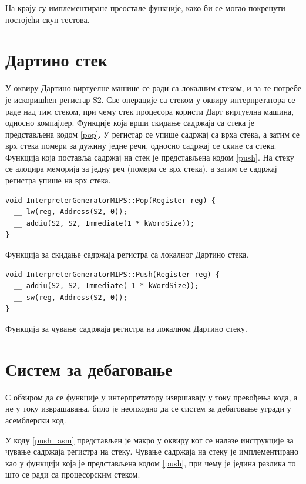 \documentclass[12pt,oneside]{memoir}
\begin{document}
На крају су имплементиране преостале функције, како би се могао покренути постојећи скуп тестова.

\section{Дартино стек}
\label{sec:stek}

У оквиру Дартино виртуелне машине се ради са локалним стеком, и за те потребе је искоришћен регистар S2. Све операције са стеком у оквиру интерпретатора се раде над тим стеком, при чему стек процесора користи Дарт виртуелна машина, односно компајлер.
Функције која врши скидање садржаја са стека је представљена кодом \ref{pop}. У регистар се упише садржај са врха стека, а затим се врх стека помери за дужину једне речи, односно садржај се скине са стека.
Функција која поставља садржај на стек је представљена кодом \ref{push}. На стеку се алоцира меморија за једну реч (помери се врх стека), а затим се садржај регистра упише на врх стека.\\

\begin{listing}
\begin{verbatim}
void InterpreterGeneratorMIPS::Pop(Register reg) {
  __ lw(reg, Address(S2, 0));
  __ addiu(S2, S2, Immediate(1 * kWordSize));
}
\end{verbatim}
\caption{Функција за скидање садржаја регистра са локалног Дартино стека.}
\label{pop}
\end{listing}

\begin{listing}
\begin{verbatim}
void InterpreterGeneratorMIPS::Push(Register reg) {
  __ addiu(S2, S2, Immediate(-1 * kWordSize));
  __ sw(reg, Address(S2, 0));
}
\end{verbatim}
\caption{Функција за чување садржаја регистра на локалном Дартино стеку.}
\label{push}
\end{listing}

\section{Систем за дебаговање}
\label{sec:debagovanje}

С обзиром да се функције у интерпретатору извршавају у току превођења кода, а не у току изврашавања, било је неопходно да се систем за дебаговање угради у асемблерски код.

У коду \ref{push_asm} представљен је макро у оквиру ког се налазе инструкције за чување садржаја регистра на стеку. Чување садржаја на стеку је имплементирано као у функцији која је представљена кодом \ref{push}, при чему је једина разлика то што се ради са процесорским стеком.
\end{document}
